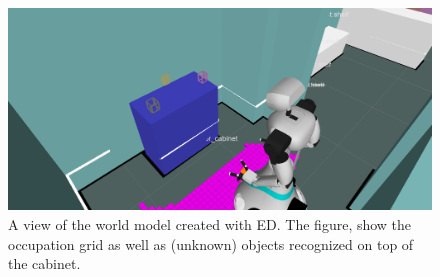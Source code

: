 \begin{figure}[ht]
	\includegraphics[width = \linewidth]{Figures/ed_segmentation}
	\caption{A view of the world model created with ED. The figure, show the occupation grid as well as (unknown) objects recognized on top of the cabinet.}
	\label{fig:ed_segmentation}
\end{figure}
